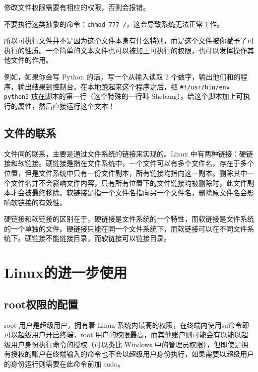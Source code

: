 \documentclass[../main.tex]{subfiles}
\begin{document}
\begin{tip}
  修改文件权限需要有相应的权限，否则会报错。
\end{tip}

\begin{warning}
  不要执行这类抽象的命令：\texttt{chmod 777 /}，这会导致系统无法正常工作。
\end{warning}

所以可执行文件并不是因为这个文件本身有什么特别，而是这个文件被你赋予了可执行的性质。一个简单的文本文件也可以被加上可执行的权限，也可以发挥操作其他文件的作用。

例如，如果你会写 Python 的话，写一个从输入读取 2 个数字，输出他们和的程序，输出结果到控制台。在本地跑起来这个程序之后，把 \texttt{\#!/usr/bin/env python3} 放在脚本的第一行（这个特殊的一行叫 Shebang）。给这个脚本加上可执行的属性，然后直接运行这个文本！

\subsection{文件的联系}

文件间的联系，主要是通过文件系统的链接来实现的。Linux 中有两种链接：硬链接和软链接。硬链接是指在文件系统中，一个文件可以有多个文件名，存在于多个位置，但是文件系统中只有一份文件副本，所有链接均指向这一副本。删除其中一个文件名并不会影响文件内容，只有所有位置下的文件链接均被删除时，此文件副本才会被最终移除。软链接是指一个文件名指向另一个文件名，删除原文件名会影响软链接的有效性。

硬链接和软链接的区别在于，硬链接是文件系统的一个特性，而软链接是文件系统的一个单独的文件。硬链接只能在同一个文件系统下，而软链接可以在不同文件系统下。硬链接不能链接目录，而软链接可以链接目录。

\section{Linux的进一步使用}

\subsection{root权限的配置}

root 用户是超级用户，拥有着 Linux 系统内最高的权限，在终端内使用su命令即可以超级用户开启终端，root 用户的权限最高，而其他账户则可能会有以能以超级用户身份执行命令的授权（可以类比 Windows 中的管理员权限），但即使是拥有授权的账户在终端输入的命令也不会以超级用户身份执行，如果需要以超级用户的身份运行则需要在此命令前加 sudo。
\end{document}
